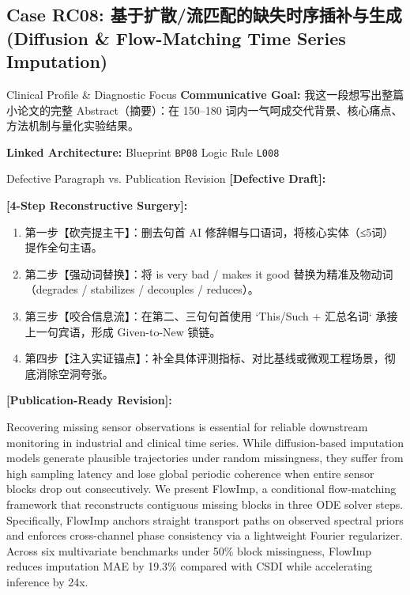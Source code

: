 \subsection{Case RC08: 基于扩散/流匹配的缺失时序插补与生成 (Diffusion \& Flow-Matching Time Series Imputation)}\label{case:RC08}
\begin{ConceptBox}{Clinical Profile \& Diagnostic Focus}
\textbf{Communicative Goal:} 我这一段想写出整篇小论文的完整 Abstract（摘要）：在 150--180 词内一气呵成交代背景、核心痛点、方法机制与量化实验结果。\par
\textbf{Linked Architecture:} Blueprint \texttt{BP08} \enspace\textbar\enspace Logic Rule \texttt{L008}
\end{ConceptBox}
\begin{ExampleBox}{Defective Paragraph vs. Publication Revision}
\textbf{\color{TargetHighlight}[Defective Draft]:}\par
{}\par\vspace{6pt}
\textbf{\color{AcadForest}[4-Step Reconstructive Surgery]:}
\begin{enumerate}[label=\textbf{\color{AcadNavy}Step \arabic*:}, leftmargin=2em]
  \item 第一步【砍壳提主干】：删去句首 AI 修辞帽与口语词，将核心实体（≤5词）提作全句主语。
  \item 第二步【强动词替换】：将 is very bad / makes it good 替换为精准及物动词（degrades / stabilizes / decouples / reduces）。
  \item 第三步【咬合信息流】：在第二、三句句首使用 `This/Such + 汇总名词` 承接上一句宾语，形成 Given-to-New 锁链。
  \item 第四步【注入实证锚点】：补全具体评测指标、对比基线或微观工程场景，彻底消除空洞夸张。
\end{enumerate}\vspace{4pt}
\textbf{\color{AcadNavy}[Publication-Ready Revision]:}\par
Recovering missing sensor observations is essential for reliable downstream monitoring in industrial and clinical time series. While diffusion-based imputation models generate plausible trajectories under random missingness, they suffer from high sampling latency and lose global periodic coherence when entire sensor blocks drop out consecutively. We present FlowImp, a conditional flow-matching framework that reconstructs contiguous missing blocks in three ODE solver steps. Specifically, FlowImp anchors straight transport paths on observed spectral priors and enforces cross-channel phase consistency via a lightweight Fourier regularizer. Across six multivariate benchmarks under 50\% block missingness, FlowImp reduces imputation MAE by 19.3\% compared with CSDI while accelerating inference by 24x.
\end{ExampleBox}
